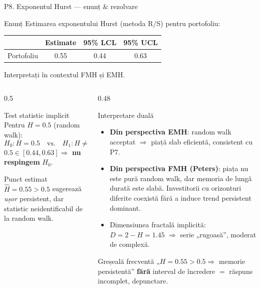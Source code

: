 \documentclass[9pt, aspectratio=169, t]{beamer}
\begin{document}
\begin{frame}[shrink=30]{P8. Exponentul Hurst --- enunț \& rezolvare}
\begin{block}{Enunț}
Estimarea exponentului Hurst (metoda R/S) pentru portofoliu:
\begin{center}\small
\begin{tabular}{lccc}\toprule
 & Estimate & 95\% LCL & 95\% UCL\\\midrule
Portofoliu & 0.55 & 0.44 & 0.63\\\bottomrule
\end{tabular}
\end{center}
Interpretați în contextul FMH și EMH.
\end{block}
\begin{columns}[T]
\begin{column}{0.5\textwidth}
\begin{block}{Test statistic implicit}
Pentru $H=0.5$ (random walk):
\[
H_0: H=0.5 \quad\text{vs.}\quad H_1: H\neq 0.5
\]
$0.5 \in [0.44, 0.63]\Rightarrow$ \textbf{nu respingem} $H_0$.

Punct estimat $\hat H=0.55 > 0.5$ sugerează \emph{ușor} persistent, dar statistic neidentificabil de la random walk.
\end{block}
\end{column}
\begin{column}{0.48\textwidth}
\begin{block}{Interpretare duală}
\begin{itemize}\setlength{\itemsep}{1pt}
    \item \textbf{Din perspectiva EMH}: random walk acceptat $\Rightarrow$ piață slab eficientă, consistent cu P7.
    \item \textbf{Din perspectiva FMH (Peters)}: piața nu este pură random walk, dar memoria de lungă durată este slabă. Investitorii cu orizonturi diferite coexistă fără a induce trend persistent dominant.
    \item Dimensiunea fractală implicită: $D=2-H=1.45$ $\Rightarrow$ serie „rugoasă'', moderat de complexă.
\end{itemize}
\end{block}
\begin{alertblock}{Greșeală frecventă}
„$H=0.55>0.5\Rightarrow$ memorie persistentă'' \textbf{fără} interval de încredere $=$ răspuns incomplet, depunctare.
\end{alertblock}
\end{column}
\end{columns}
\end{frame}
\end{document}
